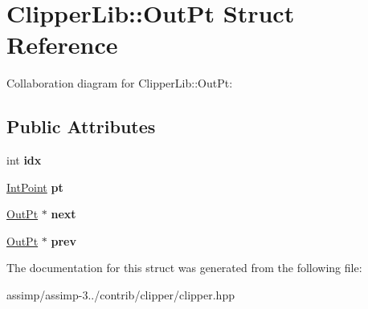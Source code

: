 \hypertarget{struct_clipper_lib_1_1_out_pt}{\section{Clipper\+Lib\+:\+:Out\+Pt Struct Reference}
\label{struct_clipper_lib_1_1_out_pt}
}


Collaboration diagram for Clipper\+Lib\+:\+:Out\+Pt\+:
\subsection*{Public Attributes}
\begin{DoxyCompactItemize}
\item 
\hypertarget{struct_clipper_lib_1_1_out_pt_a26b2c6bbb58aeb1fb8f735f8c9724828}{int {\bfseries idx}}\label{struct_clipper_lib_1_1_out_pt_a26b2c6bbb58aeb1fb8f735f8c9724828}

\item 
\hypertarget{struct_clipper_lib_1_1_out_pt_a5caa323c71f499f356787736bdf56570}{\hyperlink{struct_clipper_lib_1_1_int_point}{Int\+Point} {\bfseries pt}}\label{struct_clipper_lib_1_1_out_pt_a5caa323c71f499f356787736bdf56570}

\item 
\hypertarget{struct_clipper_lib_1_1_out_pt_ac3c6f3399717ca134aaa21e6c3915cf7}{\hyperlink{struct_clipper_lib_1_1_out_pt}{Out\+Pt} $\ast$ {\bfseries next}}\label{struct_clipper_lib_1_1_out_pt_ac3c6f3399717ca134aaa21e6c3915cf7}

\item 
\hypertarget{struct_clipper_lib_1_1_out_pt_a381945867f8900451ab3c9542e9fdbab}{\hyperlink{struct_clipper_lib_1_1_out_pt}{Out\+Pt} $\ast$ {\bfseries prev}}\label{struct_clipper_lib_1_1_out_pt_a381945867f8900451ab3c9542e9fdbab}

\end{DoxyCompactItemize}


The documentation for this struct was generated from the following file\+:\begin{DoxyCompactItemize}
\item 
assimp/assimp-\/3../contrib/clipper/clipper.\+hpp\end{DoxyCompactItemize}
